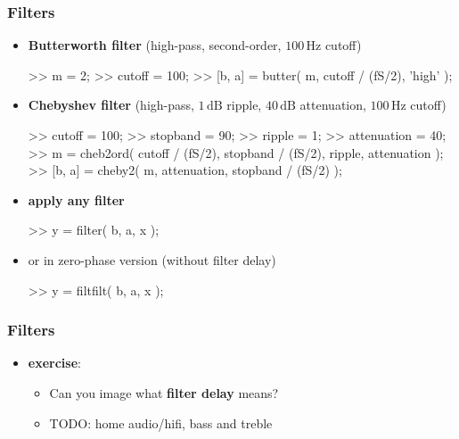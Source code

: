 \begin{frame}[fragile] %
	\frametitle{Filters}
	\begin{itemize}
		\item \textbf{Butterworth filter} (high-pass, second-order, $100\,\textrm{Hz}$ cutoff)
			\begin{code}
>> m = 2; \color{medium}%
>> cutoff = 100; \color{medium}%
>> [b, a] = butter( m, cutoff / (fS/2), 'high' );
			\end{code}
		\item \textbf{Chebyshev filter} (high-pass, $1\,\textrm{dB}$ ripple, $40\,\textrm{dB}$ attenuation, $100\,\textrm{Hz}$ cutoff)
			\begin{code}
>> cutoff = 100; \color{medium}%
>> stopband = 90; \color{medium}%
>> ripple = 1; \color{medium}%
>> attenuation = 40; \color{medium}%
>> m = cheb2ord( cutoff / (fS/2), stopband / (fS/2), ripple, attenuation );
>> [b, a] = cheby2( m, attenuation, stopband / (fS/2) );
			\end{code}
		\item \textbf{apply any filter}
			\begin{code}
>> y = filter( b, a, x ); \color{medium}%
			\end{code}
		\item or in zero-phase version (without filter delay)
			\begin{code}
>> y = filtfilt( b, a, x ); \color{medium}%
			\end{code}
	\end{itemize}
\end{frame}

\begin{frame} %
	\frametitle{Filters}
	\begin{itemize}
		\item \textbf{exercise}:
			\begin{itemize}
				\item Can you image what \textbf{filter delay} means?
				\item TODO: home audio/hifi, bass and treble
			\end{itemize}
	\end{itemize}
\end{frame}

